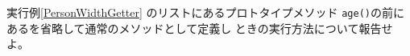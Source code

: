 \begin{Prob}\upshape
 実行例\else\ref{PersonWidthGetter}\fi
 のリストにあるプロトタイプメソッド
 \texttt{age()}の前にあるを省略して通常のメソッドとして定義し
 ときの実行方法について報告せよ。
\end{Prob}
\ifText %
\ \vspace{0.2\textheight}\fi
